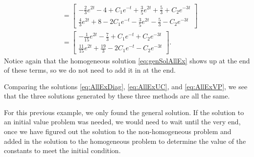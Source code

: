 \documentclass{ximera}
\begin{document}
\begin{exampleSol}
\begin{enumerate}
\begin{equation}
\begin{split}
                    &= \begin{bmatrix} 
                        -\frac{2}{3}e^{2t} - 4 + C_1e^{-t} + \frac{3}{5}e^{2t} + \frac{5}{3} + C_2e^{-3t} \\
                         \frac{4}{3}e^{2t} + 8 - 2C_1e^{-t} - \frac{3}{5}e^{2t} - \frac{5}{3} - C_2e^{-3t}
                    \end{bmatrix} \\
                    &= \begin{bmatrix}
                        -\frac{1}{15} e^{2t} - \frac{7}{3} + C_1e^{-t} + C_2e^{-3t} \\
                        \frac{11}{15}e^{2t} + \frac{19}{3} - 2C_1e^{-t} - C_2e^{-3t}
                    \end{bmatrix}.
                \end{split}
            \end{equation}
        Notice again that the homogeneous solution \eqref{eq:genSolAllEx} shows up at the end of these terms, so we do not need to add it in at the end.
    \end{enumerate}
    Comparing the solutions \eqref{eq:AllExDiag}, \eqref{eq:AllExUC}, and \eqref{eq:AllExVP}, we see that the three solutions generated by these three methods are all the same. 
\end{exampleSol}

For this previous example, we only found the general solution. If the solution to an initial value problem was needed, we would need to wait until the very end, once we have figured out the solution to the non-homogeneous problem and added in the solution to the homogeneous problem to determine the value of the constants to meet the initial condition.  
\end{document}
